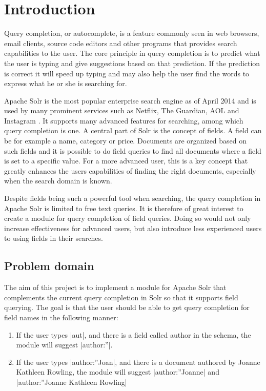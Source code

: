 \section{Introduction}\label{introduction}
Query completion, or autocomplete, is a feature commonly seen in web browsers, email clients, source code editors and other programs that provides search capabilities to the user. The core principle in query completion is to predict what the user is typing and give suggestions based on that prediction. If the prediction is correct it will speed up typing and may also help the user find the words to express what he or she is searching for. 

Apache Solr is the most popular enterprise search engine as of April 2014\cite{RANKINGS} and is used by many prominent services such as Netflix, The Guardian, AOL and Instagram \cite{SOLR::USAGE}. It supports many advanced features for searching, among which query completion is one. A central part of Solr is the concept of fields. A field can be for example a name, category or price. Documents are organized based on such fields and it is possible to do field queries to find all documents where a field is set to a specific value. For a more advanced user, this is a key concept that greatly enhances the users capabilities of finding the right documents, especially when the search domain is known. 

Despite fields being such a powerful tool when searching, the query completion in Apache Solr is limited to free text queries. It is therefore of great interest to create a module for query completion of field queries. Doing so would not only increase effectiveness for advanced users, but also introduce less experienced users to using fields in their searches.


\subsection{Problem domain}

The aim of this project is to implement a module for Apache Solr that complements the current query completion in Solr so that it supports field querying. The goal is that the user should be able to get query completion for field names in the following manner:
\begin{enumerate}
\item   If the user types |aut|, and there is a field called author in the schema, the module will suggest |author:”|. 
\item   If the user types |author:”Joan|, and there is a document authored by Joanne Kathleen Rowling, the module will suggest |author:”Joanne| and |author:”Joanne Kathleen Rowling|
\end{enumerate}

